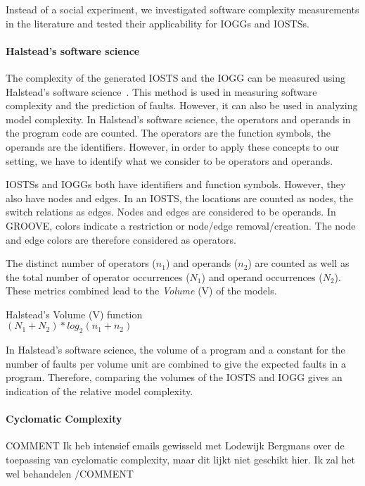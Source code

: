 Instead of a social experiment, we investigated software complexity measurements in the literature and tested their applicability for IOGGs and IOSTSs. 

\paragraph*{Halstead's software science} The complexity of the generated IOSTS and the IOGG can be measured using Halstead's software science~\cite{Halstead:software-science}. This method is used in measuring software complexity and the prediction of faults. However, it can also be used in analyzing model complexity. In Halstead's software science, the operators and operands in the program code are counted. The operators are the function symbols, the operands are the identifiers. However, in order to apply these concepts to our setting, we have to identify what we consider to be operators and operands.

IOSTSs and IOGGs both have identifiers and function symbols. However, they also have nodes and edges. In an IOSTS, the locations are counted as nodes, the switch relations as edges. Nodes and edges are considered to be operands. In GROOVE, colors indicate a restriction or node/edge removal/creation. The node and edge colors are therefore considered as operators.

The distinct number of operators ($n_1$) and operands ($n_2$) are counted as well as the total number of operator occurrences ($N_1$) and operand occurrences ($N_2$). These metrics combined lead to the \textit{Volume} (V) of the models.
\vspace{10px}\begin{definition} Halstead's Volume (V) function \\
$(N_1+N_2)*\mathit{log}_2(n_1+n_2)$
\end{definition}\vspace{10px}
In Halstead's software science, the volume of a program and a constant for the number of faults per volume unit are combined to give the expected faults in a program. Therefore, comparing the volumes of the IOSTS and IOGG gives an indication of the relative model complexity.

\paragraph*{Cyclomatic Complexity} COMMENT Ik heb intensief emails gewisseld met Lodewijk Bergmans over de toepassing van cyclomatic complexity, maar dit lijkt niet geschikt hier. Ik zal het wel behandelen $/$COMMENT

